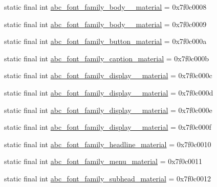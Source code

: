 \begin{DoxyCompactItemize}
\item 
static final int \mbox{\hyperlink{classandroid_1_1support_1_1v7_1_1appcompat_1_1_r_1_1string_adaa0ecc02001e33c4337d727dfdf67c4}{abc\+\_\+font\+\_\+family\+\_\+body\+\_\+\_\+material}} = 0x7f0c0008
\item 
static final int \mbox{\hyperlink{classandroid_1_1support_1_1v7_1_1appcompat_1_1_r_1_1string_a6127fc35768e2627c9ba2221605f791e}{abc\+\_\+font\+\_\+family\+\_\+body\+\_\+\_\+material}} = 0x7f0c0009
\item 
static final int \mbox{\hyperlink{classandroid_1_1support_1_1v7_1_1appcompat_1_1_r_1_1string_a2429f6336734f4aada6e25c554c6664e}{abc\+\_\+font\+\_\+family\+\_\+button\+\_\+material}} = 0x7f0c000a
\item 
static final int \mbox{\hyperlink{classandroid_1_1support_1_1v7_1_1appcompat_1_1_r_1_1string_a0f7d1696200dbc7ff9e5252fa543fbb3}{abc\+\_\+font\+\_\+family\+\_\+caption\+\_\+material}} = 0x7f0c000b
\item 
static final int \mbox{\hyperlink{classandroid_1_1support_1_1v7_1_1appcompat_1_1_r_1_1string_a177aacdc666532983bbc01a7f8586670}{abc\+\_\+font\+\_\+family\+\_\+display\+\_\+\_\+material}} = 0x7f0c000c
\item 
static final int \mbox{\hyperlink{classandroid_1_1support_1_1v7_1_1appcompat_1_1_r_1_1string_af31d18a3d6df8714aa28bd3b9c4655b5}{abc\+\_\+font\+\_\+family\+\_\+display\+\_\+\_\+material}} = 0x7f0c000d
\item 
static final int \mbox{\hyperlink{classandroid_1_1support_1_1v7_1_1appcompat_1_1_r_1_1string_a9d03424325dfb40b87aecd3dcde35abf}{abc\+\_\+font\+\_\+family\+\_\+display\+\_\+\_\+material}} = 0x7f0c000e
\item 
static final int \mbox{\hyperlink{classandroid_1_1support_1_1v7_1_1appcompat_1_1_r_1_1string_a95a8f995e232d77e93de59a700e2bb07}{abc\+\_\+font\+\_\+family\+\_\+display\+\_\+\_\+material}} = 0x7f0c000f
\item 
static final int \mbox{\hyperlink{classandroid_1_1support_1_1v7_1_1appcompat_1_1_r_1_1string_a1647ce9c5c7fb0407af0882f008a57aa}{abc\+\_\+font\+\_\+family\+\_\+headline\+\_\+material}} = 0x7f0c0010
\item 
static final int \mbox{\hyperlink{classandroid_1_1support_1_1v7_1_1appcompat_1_1_r_1_1string_a430994965ab1d4460b529593cb3f643a}{abc\+\_\+font\+\_\+family\+\_\+menu\+\_\+material}} = 0x7f0c0011
\item 
static final int \mbox{\hyperlink{classandroid_1_1support_1_1v7_1_1appcompat_1_1_r_1_1string_aae4ea6c6d51011fffdee7acfc7ddb67a}{abc\+\_\+font\+\_\+family\+\_\+subhead\+\_\+material}} = 0x7f0c0012

\end{DoxyCompactItemize}
